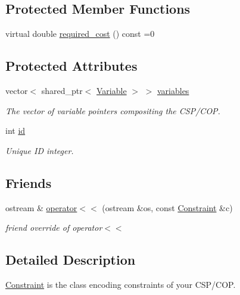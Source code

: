 \subsection*{Protected Member Functions}
\begin{DoxyCompactItemize}
\item 
virtual double \hyperlink{classghost_1_1Constraint_a6ef4cd03a4dc864a8d308e55044c615d}{required\-\_\-cost} () const =0
\end{DoxyCompactItemize}
\subsection*{Protected Attributes}
\begin{DoxyCompactItemize}
\item 
vector$<$ shared\-\_\-ptr$<$ \hyperlink{classghost_1_1Variable}{Variable} $>$ $>$ \hyperlink{classghost_1_1Constraint_a14585a4765af0acb14a14788929726c3}{variables}
\begin{DoxyCompactList}\small\item\em The vector of variable pointers compositing the C\-S\-P/\-C\-O\-P. \end{DoxyCompactList}\item 
int \hyperlink{classghost_1_1Constraint_a5215df3cd5269adb4c5f6168191b9d47}{id}
\begin{DoxyCompactList}\small\item\em Unique I\-D integer. \end{DoxyCompactList}\end{DoxyCompactItemize}
\subsection*{Friends}
\begin{DoxyCompactItemize}
\item 
ostream \& \hyperlink{classghost_1_1Constraint_a7233f9b589a413e310991431039b05b6}{operator$<$$<$} (ostream \&os, const \hyperlink{classghost_1_1Constraint}{Constraint} \&c)
\begin{DoxyCompactList}\small\item\em friend override of operator$<$$<$ \end{DoxyCompactList}\end{DoxyCompactItemize}


\subsection{Detailed Description}
\hyperlink{classghost_1_1Constraint}{Constraint} is the class encoding constraints of your C\-S\-P/\-C\-O\-P. 

